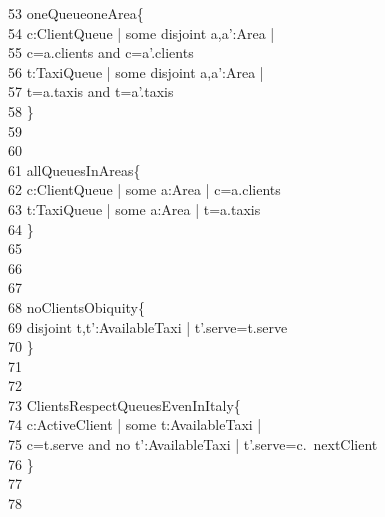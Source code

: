 \-    \ 53	 oneQueueoneArea\{\\
\-    \ 54	\qquad \- c:ClientQueue | {\color{blue}some} disjoint a,a':Area | \\
\-    \ 55	\qquad \-\qquad \-\qquad c=a.clients  {\color{blue}and}  c=a'.clients\\
\-    \ 56	\qquad \- t:TaxiQueue | {\color{blue}some} disjoint a,a':Area |\\
\-    \ 57	\qquad \-\qquad \-\qquad  t=a.taxis  {\color{blue}and}  t=a'.taxis\\
\-    \ 58	\qquad \}\\
\-    \ 59	\qquad \\
\-    \ 60	\\
\-    \ 61	 allQueuesInAreas\{\\
\-    \ 62	\qquad \- c:ClientQueue | {\color{blue}some} a:Area | c=a.clients\\
\-    \ 63	\qquad \- t:TaxiQueue | {\color{blue}some} a:Area | t=a.taxis\\
\-    \ 64	\qquad \}\\
\-    \ 65	\qquad \\
\-    \ 66	\\
\-    \ 67	\\
\-    \ 68	 noClientsObiquity\{\\
\-    \ 69	\qquad \- disjoint t,t':AvailableTaxi | t'.serve=t.serve\\
\-    \ 70	\qquad \}\\
\-    \ 71	\qquad \\
\-    \ 72	\\
\-    \ 73	 ClientsRespectQueuesEvenInItaly\{\\
\-    \ 74	\qquad \- c:ActiveClient | {\color{blue}some} t:AvailableTaxi | \\
\-    \ 75	\qquad \-\qquad c=t.serve {\color{blue}and} no t':AvailableTaxi | t'.serve=c.~nextClient \\
\-    \ 76	\qquad \}\\
\-    \ 77	\qquad \\
\-    \ 78	\\
